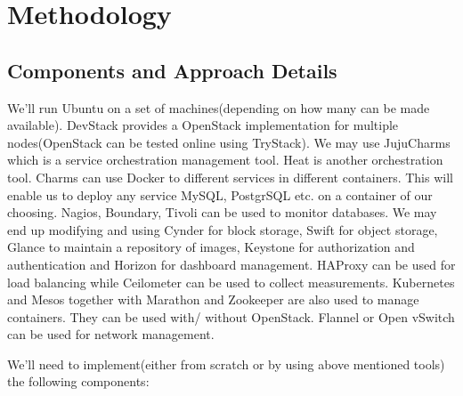 \documentclass[a4paper]{article}
\begin{document}
  \section{Methodology}
  
  \subsection{Components and Approach Details}
  
  We'll run Ubuntu on a set of machines(depending on how many can be made available). DevStack provides a OpenStack implementation for multiple nodes(OpenStack can be tested online using TryStack). We may use JujuCharms which is a service orchestration management tool. Heat is another orchestration tool. Charms can use Docker to different services in different containers. This will enable us to deploy any service MySQL, PostgrSQL etc. on a container of our choosing. Nagios, Boundary, Tivoli can be used to monitor databases. We may end up modifying and using Cynder for block storage, Swift for object storage, Glance to maintain a repository of images, Keystone for authorization and authentication and Horizon for dashboard management. HAProxy can be used for load balancing while Ceilometer can be used to collect measurements. Kubernetes and Mesos together with Marathon and Zookeeper are also used to manage containers. They can be used with/ without OpenStack. Flannel or Open vSwitch can be used for network management.
  
  We'll need to implement(either from scratch or by using above mentioned tools) the following components:
  
\end{document}
